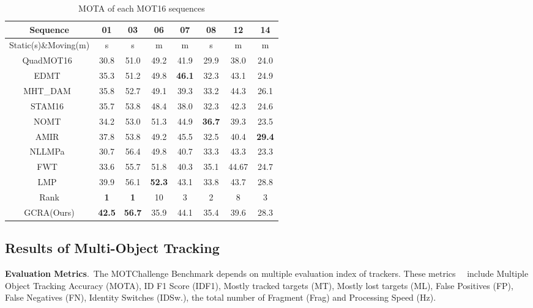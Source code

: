 \documentclass[5pt]{article}
\begin{document}
\begin{table}[h]\scriptsize
\vspace{-0.4cm}
\begin{center}
\caption{MOTA of each MOT16 sequences} \label{tab:cap}
\vspace{-0.1cm}
\begin{tabular}{c|c|c|c|c|c|c|c}

\hline
  Sequence  & 01& 03 & 06 & 07 & 08 & 12 & 14 \\
    \hline
  Static(s)\&Moving(m)  & s& s & m & m & s & m & m \\
  \hline
  \hline
  QuadMOT16~\cite{son2017multi} & 30.8  & 51.0 & 49.2& 41.9 & 29.9 & 38.0 & 24.0  \\
  EDMT~\cite{kim2015multiple} & 35.3  & 51.2 & 49.8 & \textbf{46.1} & 32.3 & 43.1 & 24.9  \\
  MHT\_DAM~\cite{Henschel2017A} & 35.8  & 52.7 & 49.1 & 39.3 & 33.2 & 44.3 &26.1  \\
  STAM16~\cite{chu2017online} & 35.7&53.8&48.4&38.0&32.3&42.3&24.6  \\
  NOMT~\cite{Henschel2017A} & 34.2&53.0&51.3&44.9&\textbf{36.7}&39.3&23.5 \\
  AMIR~\cite{sadeghian2017tracking} & 37.8&53.8&49.2&45.5&32.5&40.4&\textbf{29.4} \\
  NLLMPa~\cite{wang2016joint} & 30.7&56.4&49.8&40.7&33.3&43.3&23.3  \\
  FWT~\cite{Henschel2017A} & 33.6&55.7&51.8&40.3&35.1&44.67&24.7  \\
  LMP~\cite{tang2017multiple} &39.9&56.1&\textbf{52.3}&43.1&33.8&43.7&28.8 \\
  \hline
  \hline
Rank  & \textbf{1} & \textbf{1} & 10 & 3 & 2 & 8& 3  \\
  GCRA(Ours)  & \textbf{42.5} & \textbf{56.7} & 35.9 & 44.1 & 35.4 & 39.6& 28.3  \\

  \hline
\end{tabular}
\end{center}
\vspace{-0.9cm}
\end{table}

\vspace{-0.3cm}
\subsection{Results of Multi-Object Tracking}
\vspace{-0.1cm}
\textbf {Evaluation Metrics}.\ The MOTChallenge Benchmark depends on multiple evaluation index of trackers. These metrics~\cite{bernardin2008evaluating}~\cite{ristani2016performance} include Multiple Object Tracking Accuracy (MOTA), ID F1 Score (IDF1), Mostly tracked targets (MT), Mostly lost targets (ML), False Positives (FP), False Negatives (FN), Identity Switches (IDSw.), the total number of Fragment (Frag) and Processing Speed (Hz).
\end{document}
